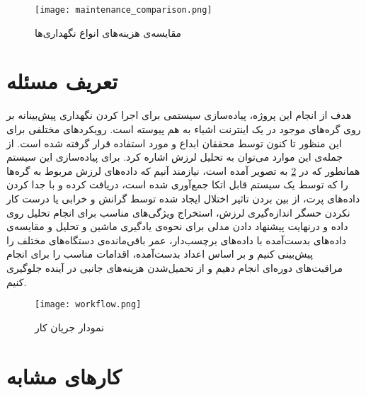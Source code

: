 \begin{figure}[!h]
\centerline{\texttt{[image: maintenance\_comparison.png]}}
\caption{مقایسه‌ی هزینه‌های انواع نگهد‌اری‌ها}
\label{fig:maintenance_comparison}
\end{figure}


\section{تعریف مسئله}
هدف از انجام این پروژه، پیاده‌سازی سیستمی برای اجرا کردن نگهداری پیش‌بینانه بر روی گره‌های موجود در یک اینترنت اشیاء به هم پیوسته است. رویکردهای مختلفی برای این منظور تا کنون توسط محققان ابداع و مورد استفاده قرار گرفته شده است. از جمله‌ی این موارد می‌توان به تحلیل لرزش اشاره کرد. برای پیاده‌سازی این سیستم همانطور که در \cref{fig:workflow} به تصویر آمده ‌است، نیازمند آنیم که داده‌های لرزش مربوط به گره‌ها را که توسط یک سیستم قابل اتکا جمع‌آوری شده است، دریافت کرده و با جدا کردن داده‌های پرت، از بین بردن تاثیر اختلال ایجاد شده توسط گرانش و خرابی یا درست‌ کار نکردن حسگر اندازه‌گیری لرزش، استخراج ویژگی‌های مناسب برای انجام تحلیل روی داده و درنهایت پیشنهاد دادن مدلی برای نحوه‌ی یادگیری ماشین و تحلیل و مقایسه‌ی داده‌های بدست‌آمده با داده‌های برچسب‌دار، عمر باقی‌مانده‌ی دستگاه‌های مختلف را پیش‌بینی کنیم و بر اساس اعداد بدست‌آمده، اقدامات مناسب را برای انجام مراقبت‌های دوره‌ای انجام دهیم و از تحمیل‌شدن هزینه‌های جانبی در آینده جلوگیری کنیم.

\begin{figure}[!h]
\centerline{\texttt{[image: workflow.png]}}
\caption{نمودار جریان کار}
\label{fig:workflow}
\end{figure}


\section{کارهای مشابه}
